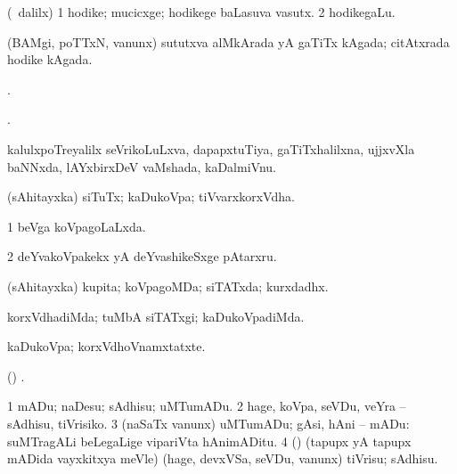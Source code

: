 {{{{{{\begin{center}
{{\bentry
{} 
\gl{\nA}
\expl{}
\bmng
(\kanmu\ \bava dalilx) 
\bnum
\num{1} hodike; mucicxge; hodikege baLasuva vasutx. 
\num{2} hodikegaLu. 
\enum
\emng
\eentry

\bentry
{} 
\gl{\nA}
\expl{}
\bmng
(BAMgi, poTTxN, \mo vanunx) sututxva alMkArada yA gaTiTx kAgada; citAtxrada hodike kAgada. 
\emng
\eentry

\bentry 
{} 
\gl{\nA}
\expl{}
\bmng
{}. 
\emng
\eentry

\bentry 
{} 
\gl{\gu}
\expl{}
\bmng
{}. 
\emng
\eentry

\bentry
{} 
\gl{\nA}
\expl{}
\bmng
kalulxpoTreyalilx seVrikoLuLxva, dapapxtuTiya, gaTiTxhalilxna, ujjxvXla baNNxda, lAYxbirxDeV vaMshada, kaDalmiVnu. 
\emng
\eentry

\bentry
{} 
\gl{\nA}
\expl{}
\bmng
(sAhitayxka) siTuTx; kaDukoVpa; tiVvarxkorxVdha. 
\emng

\noindent
\gl{\pagu}
\expl{}
\bmng
\bnum
\num{1}  beVga koVpagoLaLxda. 
\num{2}  deYvakoVpakekx yA deYvashikeSxge pAtarxru. 
\enum
\emng
\eentry

\bentry
{} 
\gl{\gu}
\expl{}
\bmng
(sAhitayxka) kupita; koVpagoMDa; siTATxda; kurxdadhx. 
\emng
\eentry

\bentry
{} 
\gl{\kirxvi}
\expl{}
\bmng
korxVdhadiMda; tuMbA siTATxgi; kaDukoVpadiMda. 
\emng
\eentry

\bentry
{} 
\gl{\nA}
\expl{}
\bmng
kaDukoVpa; korxVdhoVnamxtatxte. 
\emng
\eentry

\bentry
{} 
\gl{\gu}
\expl{}
\bmng
(\ame) . 
\emng
\eentry

\bentry
{} 
\gl{\sakirx}
\expl{}
\bmng
\bnum
\num{1} mADu; naDesu; sAdhisu; uMTumADu. 
\num{2} hage, koVpa, seVDu, veYra -- sAdhisu, tiVrisiko. 
\num{3} (naSaTx \mo vanunx) uMTumADu; gAsi, hAni -- mADu:  suMTragALi beLegaLige vipariVta hAnimADitu. 
\num{4} (\pArxparx) (tapupx yA tapupx mADida vayxkitxya meVle) (hage, devxVSa, seVDu, \mo vanunx) tiVrisu; sAdhisu. 
\enum
\emng
\eentry

}}
\end{center}}}}}}}
